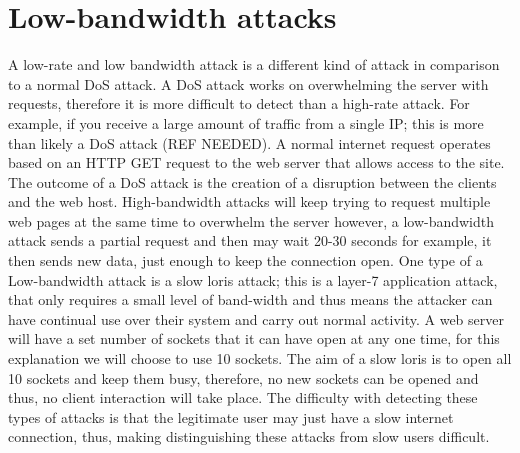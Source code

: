 
\section{Low-bandwidth attacks} \label{attack1}

A low-rate and low bandwidth attack is a different kind of attack in comparison to a normal DoS attack. A DoS attack works on overwhelming the server with requests, therefore it is more difficult to detect than a high-rate attack. For example, if you receive a large amount of traffic from a single IP; this is more than likely a DoS attack (REF NEEDED). A normal internet request operates based on an HTTP GET request to the web server that allows access to the site. The outcome of a DoS attack is the creation of a disruption between the clients and the web host. High-bandwidth attacks will keep trying to request multiple web pages at the same time to overwhelm the server however, a low-bandwidth attack sends a partial request and then may wait 20-30 seconds for example, it then sends new data, just enough to keep the connection open. One type of a Low-bandwidth attack is a slow loris attack; this is a layer-7 application attack, that only requires a small level of band-width and thus means the attacker can have continual use over their system and carry out normal activity. A web server will have a set number of sockets that it can have open at any one time, for this explanation we will choose to use 10 sockets. The aim of a slow loris is to open all 10 sockets and keep them busy, therefore, no new sockets can be opened and thus, no client interaction will take place. The difficulty with detecting these types of attacks is that the legitimate user may just have a slow internet connection, thus, making distinguishing these attacks from slow users difficult. 




